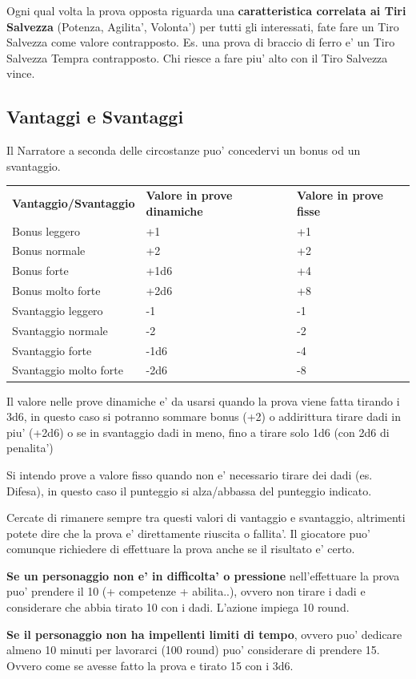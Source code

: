 \documentclass[a4paper,11pt,twoside,openany]{book}
\begin{document}
Ogni qual volta la prova opposta riguarda una \textbf{caratteristica correlata ai Tiri Salvezza} (Potenza, Agilita', Volonta') per tutti gli interessati, fate fare un Tiro Salvezza come valore contrapposto. Es. una prova di braccio di ferro e' un Tiro Salvezza Tempra contrapposto. Chi riesce a fare piu' alto con il Tiro Salvezza vince.

\bigskip

\subsection{Vantaggi e Svantaggi}

Il Narratore a seconda delle circostanze puo' concedervi un bonus od un svantaggio.

\bigskip

\begin{tabular}{lll}
\toprule
\textbf{Vantaggio/Svantaggio} & \textbf{Valore in prove dinamiche} & \textbf{Valore in prove fisse}\tabularnewline
Bonus leggero & +1 & +1\tabularnewline
Bonus normale & +2 & +2\tabularnewline
Bonus forte & +1d6 & +4\tabularnewline
Bonus molto forte & +2d6 & +8\tabularnewline
Svantaggio leggero & -1 & -1\tabularnewline
Svantaggio normale & -2 & -2\tabularnewline
Svantaggio forte & -1d6 & -4\tabularnewline
Svantaggio molto forte & -2d6 & -8\tabularnewline

\end{tabular}

\bigskip

Il valore nelle prove dinamiche e' da usarsi quando la prova viene fatta tirando i 3d6, in questo caso si potranno sommare bonus (+2) o addirittura tirare dadi in piu' (+2d6) o se in svantaggio dadi in meno, fino a tirare solo 1d6 (con 2d6 di penalita')

Si intendo prove a valore fisso quando non e' necessario tirare dei dadi (es. Difesa), in questo caso il punteggio si alza/abbassa del punteggio indicato.

Cercate di rimanere sempre tra questi valori di vantaggio e svantaggio, altrimenti potete dire che la prova e' direttamente riuscita o fallita'.
Il giocatore puo' comunque richiedere di effettuare la prova anche se il risultato e' certo.

\textbf{Se un personaggio non e' in difficolta' o pressione} nell'effettuare la prova puo' prendere il 10 (+ competenze + abilita..), ovvero non tirare i dadi e considerare che abbia tirato 10 con i dadi. L'azione impiega 10 round.

\textbf{Se il personaggio non ha impellenti limiti di tempo}, ovvero puo' dedicare almeno 10 minuti per lavorarci (100 round) puo' considerare di prendere 15. Ovvero come se avesse fatto la prova e tirato 15 con i 3d6.
\end{document}
